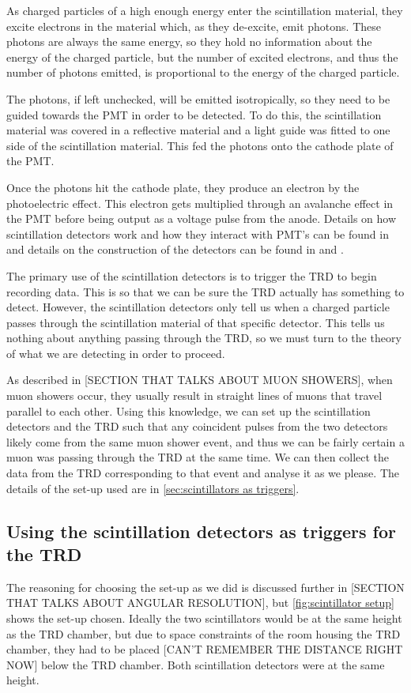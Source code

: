 \documentclass[11pt]{article}
\numberwithin{equation}{section}
\numberwithin{figure}{section}
\numberwithin{table}{section}
\begin{document}
\par As charged particles of a high enough energy enter the scintillation material, they excite electrons in the material which, as they de-excite, emit photons. These photons are always the same energy, so they hold no information about the energy of the charged particle, but the number of excited electrons, and thus the number of photons emitted, is proportional to the energy of the charged particle. 
\par The photons, if left unchecked, will be emitted isotropically, so they need to be guided towards the PMT in order to be detected. To do this, the scintillation material was covered in a reflective material and a light guide was fitted to one side of the scintillation material. This fed the photons onto the cathode plate of the PMT. 
\par Once the photons hit the cathode plate, they produce an electron by the photoelectric effect. This electron gets multiplied through an avalanche effect in the PMT before being output as a voltage pulse from the anode. Details on how scintillation detectors work and how they interact with PMT's can be found in \cite{Knoll} and details on the construction of the detectors can be found in \cite{2018 report} and \cite{2019 report}.
\newline
\par The primary use of the scintillation detectors is to trigger the TRD to begin recording data. This is so that we can be sure the TRD actually has something to detect. However, the scintillation detectors only tell us when a charged particle passes through the scintillation material of that specific detector. This tells us nothing about anything passing through the TRD, so we must turn to the theory of what we are detecting in order to proceed.
\par As described in [SECTION THAT TALKS ABOUT MUON SHOWERS], when muon showers occur, they usually result in straight lines of muons that travel parallel to each other. Using this knowledge, we can set up the scintillation detectors and the TRD such that any coincident pulses from the two detectors likely come from the same muon shower event, and thus we can be fairly certain a muon was passing through the TRD at the same time. We can then collect the data from the TRD corresponding to that event and analyse it as we please. The details of the set-up used are in \autoref{sec:scintillators as triggers}.

\subsection{Using the scintillation detectors as triggers for the TRD}\label{sec:scintillators as triggers}
\par The reasoning for choosing the set-up as we did is discussed further in [SECTION THAT TALKS ABOUT ANGULAR RESOLUTION], but \autoref{fig:scintillator setup} shows the set-up chosen. Ideally the two scintillators would be at the same height as the TRD chamber, but due to space constraints of the room housing the TRD chamber, they had to be placed [CAN'T REMEMBER THE DISTANCE RIGHT NOW] below the TRD chamber. Both scintillation detectors were at the same height.
\end{document}
